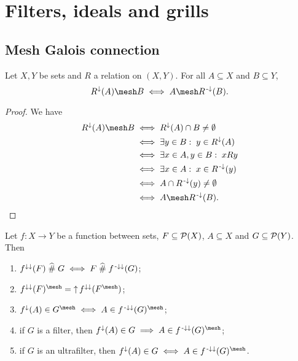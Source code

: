 \section{Filters, ideals and grills}

\subsection{Mesh Galois connection}
\begin{proposition} \label{meshConnection}
Let $X,Y$ be sets and $R$ a relation on $(X,Y)$. For all $A\subseteq X$ and $B\subseteq Y$,
\[ R^{\imf}(A)\mesh B \iff A\mesh R^\preimf(B). \]
\end{proposition}
\begin{proof}
We have
\begin{align*}
R^\imf(A) \mesh B &\iff R^\imf(A)\cap B \neq \emptyset \\
&\iff \exists y\in B: \; y\in R^\imf(A) \\
&\iff \exists x\in A, y\in B: \; xRy \\
&\iff \exists x\in A: \; x\in R^\preimf(y) \\
&\iff A\cap R^\preimf(y) \neq \emptyset \\
&\iff A\mesh R^\preimf(B).
\end{align*}
\end{proof}
\begin{corollary} \label{meshConnectionSetsOfSets}
Let $f:X \to Y$ be a function between sets, $F \subseteq \operatorname{\mathcal{P}}(X)$, $A\subseteq X$ and $G\subseteq \operatorname{\mathcal{P}}(Y)$. Then
\begin{enumerate}
\item $f^{\downarrow\downarrow}(F) \mathrel{\widehat{\#}} G \iff F \mathrel{\widehat{\#}} f^{{\text{\hspace{0.15em}-}\downarrow}\downarrow}(G)$;
\item $f^{\imf\imf}(F)^\mesh = \upset f^{\imf\imf}(F^\mesh)$;
\item $f^\imf(A)\in G^\mesh \iff A \in f^{\preimf\imf}(G)^\mesh$;
\item if $G$ is a filter, then $f^\imf(A)\in G \implies A \in f^{\preimf\imf}(G)^\mesh$;
\item if $G$ is an ultrafilter, then $f^\imf(A)\in G \iff A \in f^{\preimf\imf}(G)^\mesh$.
\end{enumerate}
\end{corollary}
